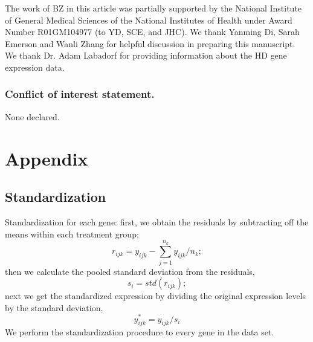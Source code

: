 \documentclass[a4,center,fleqn]{NAR}
\begin{document}
	The work of BZ in this article was partially supported by the National Institute of 
	General Medical Sciences of the National Institutes of Health under Award Number R01GM104977 
	(to YD, SCE, and JHC). We thank Yanming Di, Sarah Emerson and Wanli Zhang for helpful 
	discussion in preparing this manuscript. We thank Dr. Adam Labadorf for providing information 
	about the HD gene expression data. %

	
	
	\subsubsection{Conflict of interest statement.} None declared.
	
	\newpage
	
		\section*{Appendix}\label{section:appendix}
		
		
	\subsection{Standardization}\label{app:standardization} 
	Standardization for each gene: first, we obtain the residuals by subtracting off the means 
	within 
	each treatment group;
	\begin{equation}
		r_{ijk} = y_{ijk} - \sum_{j=1}^{n_k}{y}_{ijk}/n_k;
	\end{equation}
	then we calculate the pooled standard deviation from the residuals,
	\begin{equation}
		s_i = \textit{std}(r_{ijk});
	\end{equation}
	next we get the standardized expression by dividing the original expression levels by the
	standard deviation,
	\begin{equation}
		y^{\ast}_{ijk} = y_{ijk}/s_i
	\end{equation}
	We perform the standardization procedure to every gene in the data set.\\
	
\end{document}

